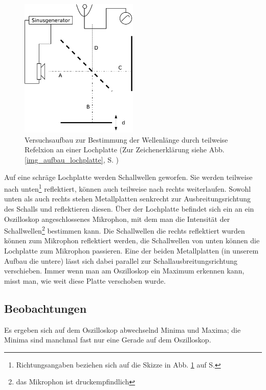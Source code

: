 \begin{figure}
	\centering
	\includegraphics[width=0.5\textwidth]{praktika/mat_praktika/doppellochplatte}   
	\caption{Versuchsaufbau zur Bestimmung der Wellenlänge durch teilweise Refelxion an einer Lochplatte (Zur Zeichenerklärung siehe Abb. \ref{img_aufbau_lochplatte}, S. \pageref{img_aufbau_lochplatte})}
	\label{img_aufbau_doppellochplatte}
\end{figure}


Auf eine schräge Lochplatte werden Schallwellen geworfen. Sie werden teilweise nach unten\footnote{Richtungsangaben beziehen sich auf die Skizze in Abb. \ref{img_aufbau_doppellochplatte} auf S. \pageref{img_aufbau_doppellochplatte}} reflektiert, können auch teilweise nach rechts weiterlaufen. Sowohl unten als auch rechts stehen Metallplatten senkrecht zur Ausbreitungsrichtung des Schalls und reflektieren diesen. Über der Lochplatte befindet sich ein an ein Oszilloskop angeschlossenes Mikrophon, mit dem man die Intensität der Schallwellen\footnote{das Mikrophon ist druckempfindlich} bestimmen kann. Die Schallwellen die rechts reflektiert wurden können zum Mikrophon reflektiert werden, die Schallwellen von unten können die Lochplatte zum Mikrophon passieren. Eine der beiden Metallplatten (in unserem Aufbau die untere) lässt sich dabei parallel zur Schallausbreitungsrichtung verschieben. Immer wenn man am Oszilloskop ein Maximum erkennen kann, misst man, wie weit diese Platte verschoben wurde.



\subsection{Beobachtungen}

Es ergeben sich auf dem Oszilloskop abwechselnd Minima und Maxima; die Minima sind manchmal fast nur eine Gerade auf dem Oszilloskop.

